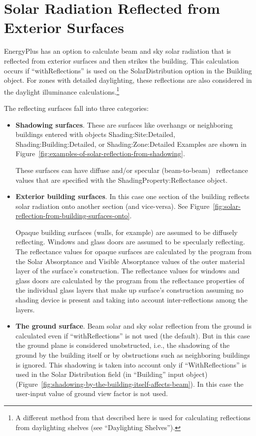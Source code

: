 \chapter{Solar Radiation Reflected from Exterior Surfaces}\label{solar-radiation-reflected-from-exterior-surfaces}

EnergyPlus has an option to calculate beam and sky solar radiation that is reflected from exterior surfaces and then strikes the building. This calculation occurs if ``withReflections'' is used on the SolarDistribution option in the Building object. For zones with detailed daylighting, these reflections are also considered in the daylight illuminance calculations.\footnote{A different method from that described here is used for calculating reflections from daylighting shelves (see ``Daylighting Shelves'').}

The reflecting surfaces fall into three categories:

\begin{itemize}
\item
  \textbf{Shadowing surfaces}. These are surfaces like overhangs or neighboring buildings entered with objects Shading:Site:Detailed, Shading:Building:Detailed, or Shading:Zone:Detailed Examples are shown in Figure~\ref{fig:examples-of-solar-reflection-from-shadowing}.

These surfaces can have diffuse and/or specular (beam-to-beam)~ reflectance values that are specified with the ShadingProperty:Reflectance object.

\item
  \textbf{Exterior building surfaces}. In this case one section of the building reflects solar radiation onto another section (and vice-versa). See Figure~\ref{fig:solar-reflection-from-building-surfaces-onto}.

Opaque building surfaces (walls, for example) are assumed to be diffusely reflecting. Windows and glass doors are assumed to be specularly reflecting. The reflectance values for opaque surfaces are calculated by the program from the Solar Absorptance and Visible Absorptance values of the outer material layer of the surface's construction. The reflectance values for windows and glass doors are calculated by the program from the reflectance properties of the individual glass layers that make up surface's construction assuming no shading device is present and taking into account inter-reflections among the layers.

\item
  \textbf{The ground surface}. Beam solar and sky solar reflection from the ground is calculated even if ``withReflections'' is not used (the default). But in this case the ground plane is considered unobstructed, i.e., the shadowing of the ground by the building itself or by obstructions such as neighboring buildings is ignored. This shadowing is taken into account only if ``WithReflections'' is used in the Solar Distribution field (in ``Building'' input object) (Figure~\ref{fig:shadowing-by-the-building-itself-affects-beam}). In this case the user-input value of ground view factor is not used.
\end{itemize}

